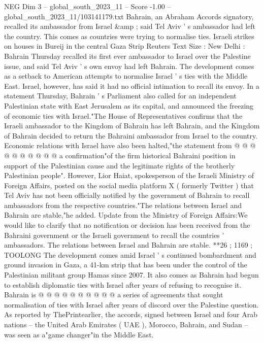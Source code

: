 \begin{textsample}{NEG Dim 3 – global\_south\_2023\_11 – Score -1.00 – global\_south\_2023\_11/103141179.txt}  \label{ex:f3_neg_108}
Bahrain, an Abraham Accords signatory, recalled its ambassador from Israel \&amp ; said Tel Aviv ' s ambassador had left the country.
This comes as countries were trying to normalise ties.
Israeli strikes on houses in Bureij in the central Gaza Strip Reuters Text Size : New Delhi : Bahrain Thursday recalled its first ever ambassador to Israel over the Palestine issue, and said Tel Aviv ' s own envoy had left Bahrain.
The development comes as a setback to American attempts to normalise Israel ' s ties with the Middle East.
Israel, however, has said it had no official intimation to recall its envoy.
In a statement Thursday, Bahrain ' s Parliament also called for an independent Palestinian state with East Jerusalem as its capital, and announced the freezing of economic ties with Israel."The House of Representatives confirms that the Israeli ambassador to the Kingdom of Bahrain has left Bahrain, and the Kingdom of Bahrain decided to return the Bahraini ambassador from Israel to the country.
Economic relations with Israel have also been halted,"the statement from @ @ @ @ @ @ @ @ @ @ a confirmation"of the firm historical Bahraini position in support of the Palestinian cause and the legitimate rights of the brotherly Palestinian people".
However, Lior Haiat, spokesperson of the Israeli Ministry of Foreign Affairs, posted on the social media platform X ( formerly Twitter ) that Tel Aviv has not been officially notified by the government of Bahrain to recall ambassadors from the respective countries."The relations between Israel and Bahrain are stable,"he added.
Update from the Ministry of Foreign Affairs:We would like to clarify that no notification or decision has been received from the Bahraini government or the Israeli government to recall the countries ' ambassadors.
The relations between Israel and Bahrain are stable. **26 ; 1169 ; TOOLONG The development comes amid Israel ' s continued bombardment and ground invasion in Gaza, a 41-km strip that has been under the control of the Palestinian militant group Hamas since 2007.
It also comes as Bahrain had begun to establish diplomatic ties with Israel after years of refusing to recognise it.
Bahrain is @ @ @ @ @ @ @ @ @ @ a series of agreements that sought normalisation of ties with Israel after years of discord over the Palestine question.
As reported by ThePrintearlier, the accords, signed between Israel and four Arab nations -- the United Arab Emirates ( UAE ), Morocco, Bahrain, and Sudan -- was seen as a"game changer"in the Middle East.

\end{textsample}
